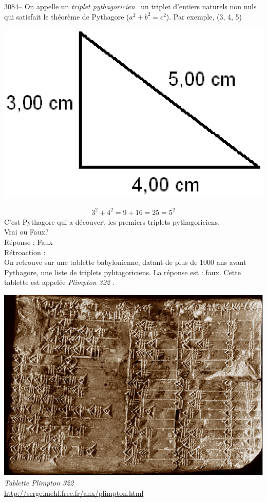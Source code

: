 \documentclass[letterpaper, 12pt]{article}
\begin{document}
3084-- On appelle un \og \emph{triplet pythagoricien} \fg \ un triplet d'entiers naturels non nuls qui satisfait le th\'eor\`eme de Pythagore ($a^{2} + b^{2} = c^{2}$). Par exemple, (3, 4, 5)\\
\begin{center}
\includegraphics[scale=0.5]{triplet345.eps}\\
\end{center}
\begin{eqnarray*}
3^{2} + 4^{2} = 9 + 16 = 25 = 5^{2}
\end{eqnarray*}
C'est Pythagore qui a d\'ecouvert les premiers triplets pythagoriciens.\\
Vrai ou Faux?\\

R\'eponse : Faux\\

R\'etroaction :\\
On retrouve sur une tablette babylonienne, datant de plus de 1000 ans avant Pythagore, une liste de triplets pyhtagoriciens. La r\'eponse est : faux. Cette tablette est appel\'ee \og \emph{Plimpton 322} \fg.
\begin{center}
\includegraphics[scale=0.25]{plimpton322.eps}\\
\emph{{\small Tablette Plimpton 322}}\\
\href{http://serge.mehl.free.fr/anx/plimpton.html}{http://serge.mehl.free.fr/anx/plimpton.html}\\[5mm]
\end{center}
\end{document}
